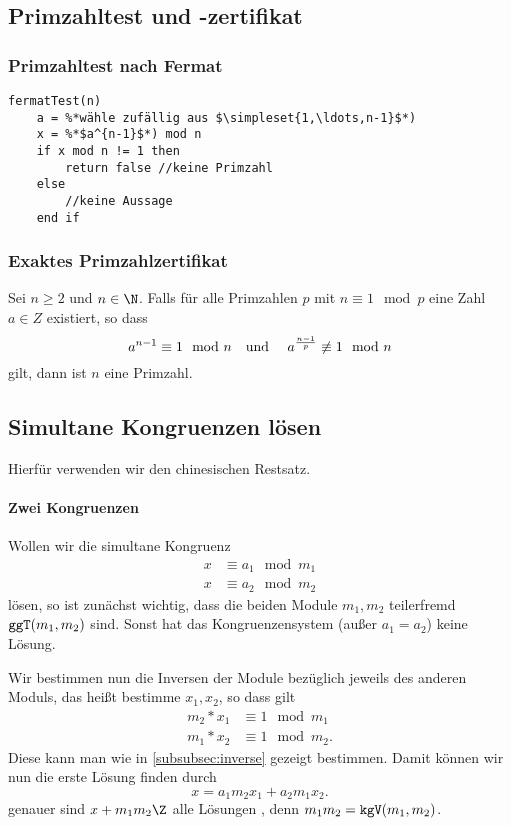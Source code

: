 \subsection{Primzahltest und -zertifikat}
\subsubsection{Primzahltest nach Fermat}
\begin{lstlisting}
fermatTest(n)
	a = %*wähle zufällig aus $\simpleset{1,\ldots,n-1}$*)
	x = %*$a^{n-1}$*) mod n
	if x mod n != 1 then
		return false //keine Primzahl
	else
		//keine Aussage
	end if
\end{lstlisting}


\subsubsection{Exaktes Primzahlzertifikat}
Sei $n\geq 2$ und $n\in\N$. Falls für alle Primzahlen $p$ mit $n\equiv 1\mod p$ eine Zahl $a\in Z$ existiert, so dass
\begin{equation*}
 	a^{n-1}\equiv 1\mod n \text{\quad und \quad}a^{\frac{n-1}p}\not\equiv 1\mod n
\end{equation*}
gilt, dann ist $n$ eine Primzahl. 

\subsection{Simultane Kongruenzen lösen}
Hierfür verwenden wir den chinesischen Restsatz.

\paragraph{Zwei Kongruenzen}
Wollen wir die simultane Kongruenz 
\begin{align*}
	x&\equiv a_1\mod m_1\\
	x&\equiv a_2\mod m_2
\end{align*}
lösen, so ist zunächst wichtig, dass die beiden Module $m_1,m_2$ teilerfremd $\texttt{ggT}(m_1,m_2)$ sind. Sonst hat das Kongruenzensystem (außer $a_1=a_2$) keine Lösung.

Wir bestimmen nun die Inversen der Module bezüglich jeweils des anderen Moduls, das heißt bestimme $x_1,x_2$, so dass gilt
\begin{align*}
	m_2*x_1&\equiv 1 \mod m_1\\
	m_1*x_2&\equiv 1 \mod m_2.
\end{align*}
Diese kann man wie in \autoref{subsubsec:inverse} gezeigt bestimmen.
Damit können wir nun die erste Lösung finden durch
\begin{equation*}
	x=a_1m_2x_1+a_2m_1x_2.
\end{equation*}
genauer sind $x+m_1m_2\Z$ alle Lösungen , denn $m_1m_2=\texttt{kgV}(m_1,m_2)$.

